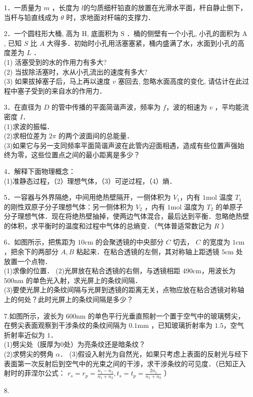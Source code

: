 
1．一质量为 $m$ ，长度为 $l$的匀质细杆铅直的放置在光滑水平面，杆自静止倒下，当杆与铅直线成为 $\theta$ 时，求地面对杆端的支撑力．

2．一个圆柱形大桶, 高为 $\mathrm{H}$, 底面积为 $\mathrm{S}$ ．桶的侧壁有一个小孔, 小孔的面积为 $\mathrm{A}$, 已知 $S$ 比 $A$ 大得多．初始时小孔用活塞塞紧，桶内盛满了水，水面到小孔的高度差为 $L$ ．\\
(1) 活塞受到的水的作用力有多大? \\
(2) 当拔除活塞时，水从小孔流出的速度有多大? \\
(3) 如果拔掉塞子后，马上再以速度 $v$ 塞回去, 忽略水面高度的变化, 请估计在此过程中塞子受到的来自水的作用力．

3．在直径为 $D$ 的管中传播的平面简谐声波，频率为 $f$，波的相速为 $v$ ，平均能流密度 $I$．\\
(1)求波的振幅．\\
(2)求相位差为 $2\pi$ 的两个波面间的总能量．\\
(3)如果它与另一支同频率平面简谐声波在此管内迎面相遇，造成有些位置声强始终为零，这些位置点之间的最小距离是多少？

4．解释下面物理概念：\\
(1)准静态过程，（2）理想气体，（3）可逆过程，（4）熵．

5．一容器与外界隔绝，中间用绝热壁隔开，一侧体积为 $V_1$，内有 $1\mathrm{mol}$ 温度 $T_1$ 的刚性双原子分子理想气体：另一侧体积为 $V_2$ ，内有 $1\mathrm{mol}$ 温度为 $T_2$ 的单原子分子理想气体．现在将绝热壁抽掉，使两边气体混合，最后达到平衡．忽略绝热壁的体积，求平衡时的温度和过程中气体的总熵变．（气体普适常数记为 $R$ ）

6．如图所示，把焦距为 $10\mathrm{cm}$ 的会聚透镜的中央部分 $C$ 切去， $C$ 的宽度为 $1\mathrm{cm}$ ，把余下的两部分 $A,B$ 粘起来．在粘合透镜的左侧，其对称轴上距透镜 $5\mathrm{cm}$ 处放置一个点物．\\
(1)求像的位置．
(2)光屏放在粘合透镜的右侧，与透镜相距 $490\mathrm{cm}$，用波长为 $500\mathrm{nm}$ 的单色光入射，求光屏上的条纹间隔．\\
(3)要使光屏上的条纹间隔与光屏到透镜的距离无关，点物应放在粘合透镜对称轴上的何处？此时光屏上的条纹间隔是多少？

7.如图所示，波长为 $600\mathrm{nm}$ 的单色平行光垂直照射一个置于空气中的玻璃劈尖，在劈尖表面观察到干涉条纹的条纹间隔为 $0.1\mathrm{mm}$ ，已知玻璃折射率为 $1.5$，空气折射率近似为 $1$．\\
(1)劈尖处（膜厚为0处）为亮条纹还是暗条纹？\\
(2)求劈尖的劈角 $\alpha$．
(3)假设入射光为自然光，如果只考虑上表面的反射光与经下表面第一次反射后到空气中的光束之间的干涉，求干涉条纹的可见度．（已知正入射时的菲涅尔公式： $r_s=r_p=\frac{n_1-n_2}{n_1+n_2},t_s=t_p=\frac{2n_1}{n_1+n_2}$ ）

8.